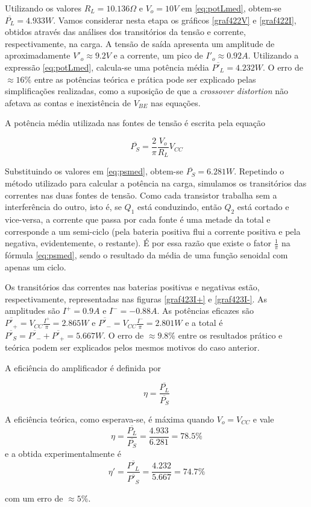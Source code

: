 \documentclass[12pt, a4paper]{article}
\begin{document}
\begin{enumerate}
    Utilizando os valores \(R_L = 10.136 \Omega \) e \(V_o = 10V\) em \ref{eq:potLmed}, obtem-se \(\overline{P_L} = 4.933W\). Vamos considerar nesta etapa os gráficos \ref{graf422V} e \ref{graf422I}, obtidos através das análises dos transitórios da tensão e corrente, respectivamente, na carga. A tensão de saída apresenta um amplitude de aproximadamente \(V'_o \approx 9.2V\) e a corrente, um pico de \(I'_o \approx 0.92A\). Utilizando a expressão \ref{eq:potLmed}, calcula-se uma potência média \(\overline{P'_L} = 4.232W\). O erro de \(\approx 16\% \) entre as potências teórica e prática pode ser explicado pelas simplificações realizadas, como a suposição de que a \textit{crossover distortion} não afetava as contas e inexistência de \(V_{BE}\) nas equações.
    
    A potência média utilizada nas fontes de tensão é escrita pela equação
    
    \begin{equation}
    \overline{P_S} = \frac{2}{\pi } \frac{V_o}{R_L}V_{CC}
    \label{eq:psmed}
    \end{equation}
    
    Substituindo os valores em \ref{eq:psmed}, obtem-se \(\overline{P_S} =
    6.281W\). Repetindo o método utilizado para calcular a potência na carga, simulamos os transitórios das correntes nas duas fontes de tensão. Como cada transistor trabalha sem a interferência do outro, isto é, se \(Q_1\) está conduzindo, então \(Q_2\) está cortado e vice-versa, a corrente que passa por cada fonte é uma metade da total e corresponde a um semi-ciclo  (pela bateria positiva flui a corrente positiva e pela negativa, evidentemente, o restante). É por essa razão que existe o fator \(\frac{1}{\pi }\) na fórmula \ref{eq:psmed},  sendo o resultado da média de uma função senoidal com apenas um ciclo.
    
    Os transitórios das correntes nas baterias positivas e negativas estão, respectivamente, representadas nas figuras \ref{graf423I+} e \ref{graf423I-}. As amplitudes são \(I^+ = 0.9A\) e \(I^- = -0.88A\). As potências eficazes são \(\overline{P'_+} = V_{CC}\frac{I^+}{\pi } = 2.865W\) e \(\overline{P'_-} = V_{CC}\frac{I^-}{\pi } = 2.801W\) e a total é \(\overline{P'_S}= \overline{P'_-} + \overline{P'_+} = 5.667W\). O erro de \(\approx 9.8 \% \) entre os resultados prático e teórica podem ser explicados pelos mesmos motivos do caso anterior.
    
    A eficiência do amplificador é definida por 
    
    \begin{equation}
    \eta = \frac{\overline{P_L}}{\overline{P_S}}
    \end{equation}
    
    A eficiência teórica, como esperava-se, é máxima quando \(V_o = V_{CC}\) e vale \[\eta = \frac{\overline{P_L}}{\overline{P_S}} = \frac{4.933}{6.281} = 78.5 \% \] e a obtida experimentalmente é \[\eta '= \frac{\overline{P'_L}}{\overline{P'_S}} = \frac{4.232}{5.667} = 74.7 \% \]
    
    com um erro de \(\approx 5 \% \). 
    \end{enumerate}
    
\end{document}
